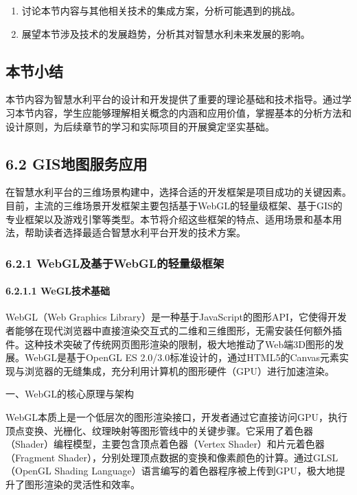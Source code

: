 \begin{enumerate}
\def\labelenumi{\arabic{enumi}.}
\setcounter{enumi}{6}
\tightlist
\item
  讨论本节内容与其他相关技术的集成方案，分析可能遇到的挑战。
\item
  展望本节涉及技术的发展趋势，分析其对智慧水利未来发展的影响。
\end{enumerate}

\subsection{本节小结}\label{ux672cux8282ux5c0fux7ed3-1}

本节内容为智慧水利平台的设计和开发提供了重要的理论基础和技术指导。通过学习本节内容，学生应能够理解相关概念的内涵和应用价值，掌握基本的分析方法和设计原则，为后续章节的学习和实际项目的开展奠定坚实基础。

\subsection{6.2 GIS地图服务应用}\label{gisux5730ux56feux670dux52a1ux5e94ux7528}

在智慧水利平台的三维场景构建中，选择合适的开发框架是项目成功的关键因素。目前，主流的三维场景开发框架主要包括基于WebGL的轻量级框架、基于GIS的专业框架以及游戏引擎等类型。本节将介绍这些框架的特点、适用场景和基本用法，帮助读者选择最适合智慧水利平台开发的技术方案。

\subsubsection{6.2.1 WebGL及基于WebGL的轻量级框架}\label{webglux53caux57faux4e8ewebglux7684ux8f7bux91cfux7ea7ux6846ux67b6}

\paragraph{6.2.1.1 WeGL技术基础}\label{weglux6280ux672fux57faux7840}

WebGL（Web Graphics Library）是一种基于JavaScript的图形API，它使得开发者能够在现代浏览器中直接渲染交互式的二维和三维图形，无需安装任何额外插件。这种技术突破了传统网页图形渲染的限制，极大地推动了Web端3D图形的发展。WebGL是基于OpenGL ES 2.0/3.0标准设计的，通过HTML5的Canvas元素实现与浏览器的无缝集成，充分利用计算机的图形硬件（GPU）进行加速渲染。

一、WebGL的核心原理与架构

WebGL本质上是一个低层次的图形渲染接口，开发者通过它直接访问GPU，执行顶点变换、光栅化、纹理映射等图形管线中的关键步骤。它采用了着色器（Shader）编程模型，主要包含顶点着色器（Vertex Shader）和片元着色器（Fragment Shader），分别处理顶点数据的变换和像素颜色的计算。通过GLSL（OpenGL Shading Language）语言编写的着色器程序被上传到GPU，极大地提升了图形渲染的灵活性和效率。

